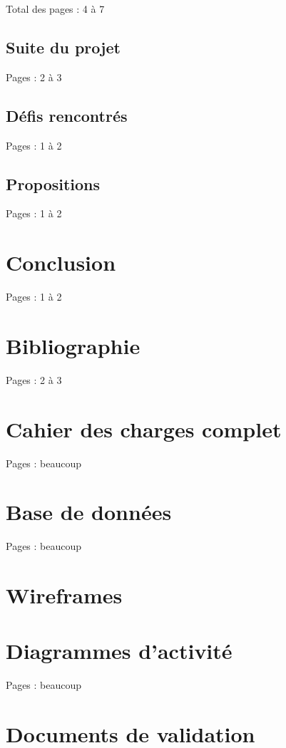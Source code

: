 \documentclass{EPL-master-thesis-covers-FR}
\begin{document}
		Total des pages : 4 à 7

		\section{Suite du projet}
			\label{ref:suite_projet}

			Pages : 2 à 3

		\section{Défis rencontrés}

			Pages : 1 à 2

		\section{Propositions}

			Pages : 1 à 2

	\chapter{Conclusion}

		Pages : 1 à 2

	\chapter*{Bibliographie}

	{}
	

		Pages : 2 à 3

	\appendix

	\chapter{Cahier des charges complet}

		Pages : beaucoup

	\chapter{Base de données}

		Pages : beaucoup

	\chapter{Wireframes}
		\label{sec:wireframes}
		

	\chapter{Diagrammes d'activité}

		Pages : beaucoup

	\chapter{Documents de validation}
		\label{sec:documents_validation}
		
	\setlength{\parskip}{0em}
	\backcoverpage
\end{document}
